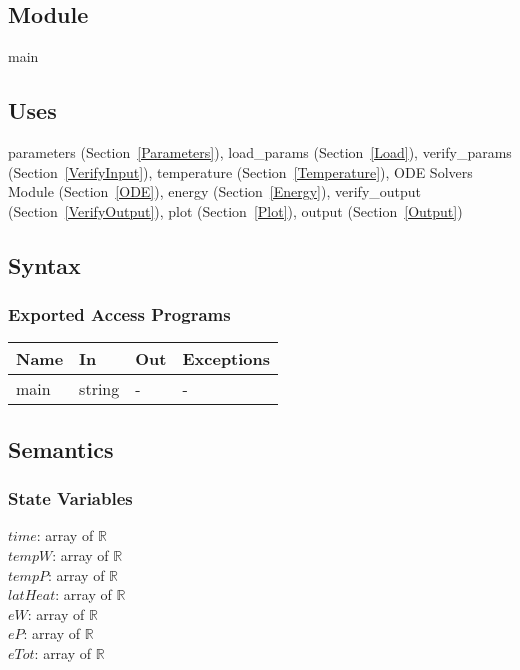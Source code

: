 \documentclass[12pt]{article}
\begin{document}
\subsection{Module}

main

\subsection{Uses}

parameters (Section~\ref{Parameters}), load\_params (Section~\ref{Load}), verify\_params
(Section~\ref{VerifyInput}), temperature (Section~\ref{Temperature}), ODE Solvers Module
(Section~\ref{ODE}), energy (Section~\ref{Energy}), verify\_output (Section~\ref{VerifyOutput}), plot
(Section~\ref{Plot}), output (Section~\ref{Output})

\subsection{Syntax}

\subsubsection{Exported Access Programs}

\begin{center}
\begin{tabular}{p{2cm} p{4cm} p{4cm} p{2cm}}
\hline
\textbf{Name} & \textbf{In} & \textbf{Out} & \textbf{Exceptions} \\
\hline
main & string & - & - \\
\hline
\end{tabular}
\end{center}

\subsection{Semantics}

\subsubsection{State Variables}

$time$: array of $\mathbb{R}$ \\
$tempW$: array of $\mathbb{R}$ \\
$tempP$: array of $\mathbb{R}$ \\
$latHeat$: array of $\mathbb{R}$ \\
$eW$: array of $\mathbb{R}$ \\
$eP$: array of $\mathbb{R}$ \\ 
$eTot$: array of $\mathbb{R}$
\end{document}
